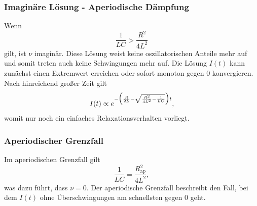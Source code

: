         \subsubsection{Imaginäre Lösung - Aperiodische Dämpfung}    
            Wenn
            \begin{equation}
                \label{eqn:bedingung_imaginär}
                \frac{1}{L C} > \frac{R^2}{4 L^2}
            \end{equation}
            gilt, ist $\nu$ imaginär.
            Diese Lösung weist keine oszillatorischen Anteile mehr auf und somit treten auch keine Schwingungen mehr auf. Die Lösung
            $I(t)$ kann zunächst einen Extremwert erreichen oder sofort monoton gegen $0$ konvergieren.
            Nach hinreichend großer Zeit gilt
            \begin{equation}
                \label{eqn:imag_lösung}
                I(t) \propto e^{-\Bigl(\frac{R}{2 L} - \sqrt{\frac{R^2}{4 L^2} - \frac {1}{L C}}\Bigr) t},
            \end{equation}
            womit nur noch ein einfaches Relaxationsverhalten vorliegt.
        
        \subsubsection{Aperiodischer Grenzfall}
            Im aperiodischen Grenzfall gilt
            \begin{equation}
                \label{eqn:bedingung_aperiodischerGrenzfall}
                \frac{1}{L C} = \frac {R_\text{ap}^2} {4 L^2},
            \end{equation}
            was dazu führt, dass $\nu = 0$.
            Der aperiodische Grenzfall beschreibt den Fall, bei dem $I(t)$ ohne Überschwingungen am schnellsten gegen $0$ geht.

